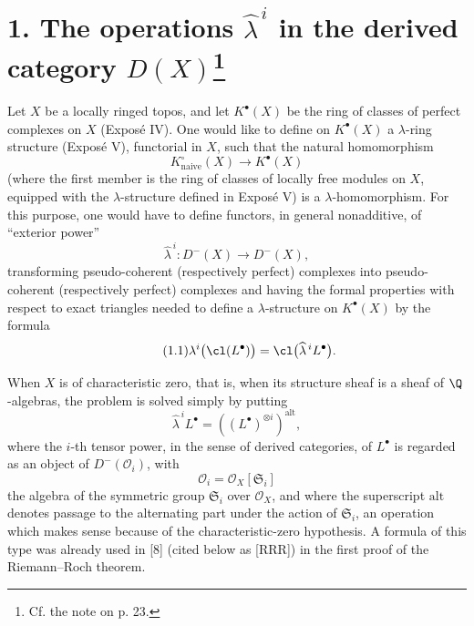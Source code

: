 \section*{1. The operations $\widehat{\lambda}^{\,i}$ in the derived category $D(X)$\footnote{Cf. the note on p. 23.}}

Let $X$ be a locally ringed topos, and let $K^\bullet(X)$ be the ring of classes of perfect complexes on $X$ (Expos\'e IV). One would like to define on $K^\bullet(X)$ a $\lambda$-ring structure (Expos\'e V), functorial in $X$, such that the natural homomorphism
\[
  K^\circ_{\mathrm{naive}}(X)\longrightarrow K^\bullet(X)
\]
(where the first member is the ring of classes of locally free modules on $X$, equipped with the $\lambda$-structure defined in Expos\'e V) is a $\lambda$-homomorphism. For this purpose, one would have to define functors, in general nonadditive, of ``exterior power''
\[
  \widehat{\lambda}^{\,i}:D^-(X)\longrightarrow D^-(X),
\]
transforming pseudo-coherent (respectively perfect) complexes into pseudo-coherent (respectively perfect) complexes and having the formal properties with respect to exact triangles needed to define a $\lambda$-structure on $K^\bullet(X)$ by the formula
\begin{equation}\tag{1.1}
  \lambda^i\bigl(\cl(L^\bullet)\bigr)
  =\cl\bigl(\widehat{\lambda}^{\,i}L^\bullet\bigr).
\end{equation}

When $X$ is of characteristic zero, that is, when its structure sheaf is a sheaf of $\Q$-algebras, the problem is solved simply by putting
\begin{equation}\tag{1.2}
  \widehat{\lambda}^{\,i}L^\bullet
  =\left((L^\bullet)^{\otimes i}\right)^{\mathrm{alt}},
\end{equation}
where the $i$-th tensor power, in the sense of derived categories, of $L^\bullet$ is regarded as an object of $D^-(\mathcal O_i)$, with
\[
  \mathcal O_i=\mathcal O_X[\mathfrak S_i]
\]
the algebra of the symmetric group $\mathfrak S_i$ over $\mathcal O_X$, and where the superscript \(\mathrm{alt}\) denotes passage to the alternating part under the action of $\mathfrak S_i$, an operation which makes sense because of the characteristic-zero hypothesis. A formula of this type was already used in [8] (cited below as [RRR]) in the first proof of the Riemann--Roch theorem.

